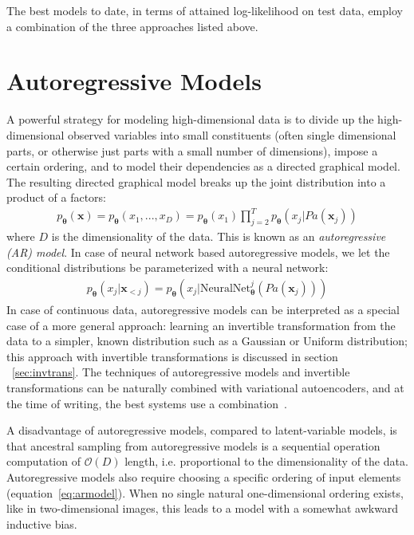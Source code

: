 \documentclass[MAL,biber]{nowfnt} %
\newcommand{\bb}[1]{\mathbf{#1}}
\newcommand{\bx}{\bb{x}}
\newcommand{\bT}{\boldsymbol{\theta}}
\newcommand{\pT}{p_{\bT}}
\newcommand{\NeuralNet}{\text{NeuralNet}}
\begin{document}
The best models to date, in terms of attained log-likelihood on test data, employ a combination of the three approaches listed above.

\section{Autoregressive Models}
\label{sec:armodel}

A powerful strategy for modeling high-dimensional data is to divide up the high-dimensional observed variables into small constituents (often single dimensional parts, or otherwise just parts with a small number of dimensions), impose a certain ordering, and to model their dependencies as a directed graphical model. The resulting directed graphical model breaks up the joint distribution into a product of a factors:
\begin{align}
    \pT(\bx) = \pT(x_1,...,x_D) = \pT(x_1) \prod_{j=2}^T \pT(x_j|Pa(\bx_j))
    \label{eq:armodel}
\end{align}
where $D$ is the dimensionality of the data. This is known as an \emph{autoregressive (AR) model}. In case of neural network based autoregressive models, we let the conditional distributions be parameterized with a neural network:
\begin{align}
    \pT(x_j|\bx_{< j}) = \pT(x_j|\NeuralNet_{\bT}^j(Pa(\bx_j)))
    \label{eq:univariate}
\end{align}
In case of continuous data, autoregressive models can be interpreted as a special case of a more general approach: learning an invertible transformation from the data to a simpler, known distribution such as a Gaussian or Uniform distribution; this approach with invertible transformations is discussed in section ~\ref{sec:invtrans}. The techniques of autoregressive models and invertible transformations can be naturally combined with variational autoencoders, and at the time of writing, the best systems use a combination~\cite{rezende2015variational, kingma2016improving, gulrajani2016pixelvae}.

A disadvantage of autoregressive models, compared to latent-variable models, is that ancestral sampling from autoregressive models is a sequential operation computation of $\mathcal{O}(D)$ length, i.e. proportional to the dimensionality of the data. Autoregressive models also require choosing a specific ordering of input elements (equation~\eqref{eq:armodel}). When no single natural one-dimensional ordering exists, like in two-dimensional images, this leads to a model with a somewhat awkward inductive bias.
\end{document}
